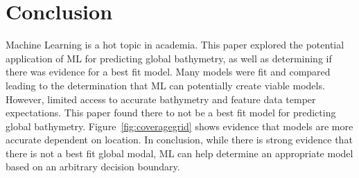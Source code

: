 \section{Conclusion}
\setlength{\parindent}{10ex}
Machine Learning is a hot topic in academia.
This paper explored the potential application of \ac{ML} for predicting global bathymetry, as well as determining if there was evidence for a best fit model.
Many models were fit and compared leading to the determination that \ac{ML} can potentially create viable models.
However, limited access to accurate bathymetry and feature data temper expectations.
This paper found there to not be a best fit model for predicting global bathymetry. 
Figure~\ref{fig:coveragegrid} shows evidence that models are more accurate dependent on location.
In conclusion, while there is strong evidence that there is not a best fit global modal, \ac{ML} can help determine an appropriate model based on an arbitrary decision boundary.